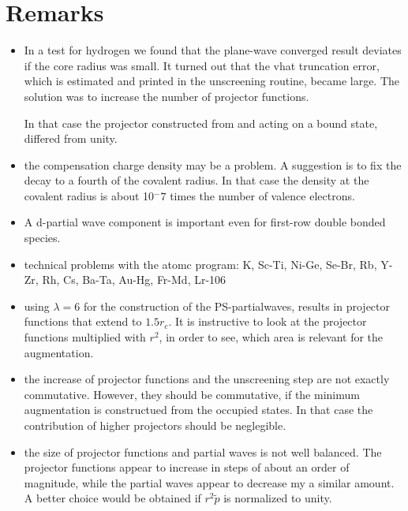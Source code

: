 \section{Remarks} 
\begin{itemize}
\item In a test for hydrogen we found that the plane-wave
converged result deviates if the core radius was small. It turned out
that the vhat truncation error, which is estimated and printed in the
unscreening routine, became large. The solution was to increase the
number of projector functions.

In that case the projector constructed from and acting on a bound
state, differed from unity.

\item the compensation charge density may be a problem. A suggestion
  is to fix the decay to a fourth of the covalent radius. In that case
  the density at the covalent radius is about 10$^-7$ times the number
  of valence electrons.

\item A d-partial wave component is important even for first-row double
  bonded species.

\item technical problems with the atomc program: K, Sc-Ti, Ni-Ge,
  Se-Br, Rb, Y-Zr, Rh, Cs, Ba-Ta, Au-Hg, Fr-Md, Lr-106

\item using $\lambda=6$ for the construction of the PS-partialwaves,
  results in projector functions that extend to $1.5 r_c$. It is
  instructive to look at the projector functions multiplied with
  $r^2$, in order to see, which area is relevant for the augmentation.
  
\item the increase of projector functions and the unscreening step are
  not exactly commutative. However, they should be commutative, if the
  minimum augmentation is constructued from the occupied states. In
  that case the contribution of higher projectors should be
  neglegible.
  
\item the size of projector functions and partial waves is not well
  balanced. The projector functions appear to increase in steps of
  about an order of magnitude, while the partial waves appear to
  decrease my a similar amount. A better choice would be obtained if
  $r^2\tilde{p}$ is normalized to unity.

\end{itemize}

